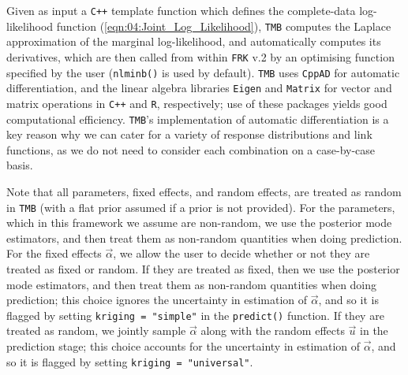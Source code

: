 \documentclass[12pt,a4paper]{article}
\begin{document}
Given as input a \texttt{C++} template function 
which defines the complete-data log-likelihood function (\ref{eqn:04:Joint_Log_Likelihood}), \texttt{TMB} computes the Laplace approximation of the marginal log-likelihood, and automatically computes its derivatives, which are then called from within \texttt{FRK} v.2 by an optimising function specified by the user (\texttt{nlminb()} is used by default). 
 \texttt{TMB} uses \texttt{CppAD} \citep{CppAD_Package} for automatic differentiation, and the linear algebra libraries \texttt{Eigen} \citep{Eigen} and \texttt{Matrix} \citep{Matrix_Package} for vector and matrix operations in \texttt{C++} and \texttt{R}, respectively; use of these packages yields good computational efficiency. 
\texttt{TMB}'s implementation of automatic differentiation is a key reason why we can cater for a variety of response distributions and link functions, as we do not need to consider each combination on a case-by-case basis.



Note that all parameters, fixed effects, and random effects, are treated as random in \texttt{TMB} (with a flat prior assumed if a prior is not provided).
For the parameters, which in this framework we assume are non-random, we use the posterior mode estimators, and then treat them as non-random quantities when doing prediction. 
For the fixed effects $\vec{\alpha}$, we allow the user to decide whether or not they are treated as fixed or random. 
If they are treated as fixed, then we use the posterior mode estimators, and then treat them as non-random quantities when doing prediction; this choice ignores the uncertainty in estimation of $\vec{\alpha}$, and so it is flagged by setting \texttt{kriging = "simple"} in the \texttt{predict()} function. 
If they are treated as random, we jointly sample $\vec{\alpha}$ along with the random effects $\vec{u}$ in the prediction stage;  this choice accounts for the uncertainty in estimation of $\vec{\alpha}$, and so it is flagged by setting \texttt{kriging = "universal"}.   


\end{document}
